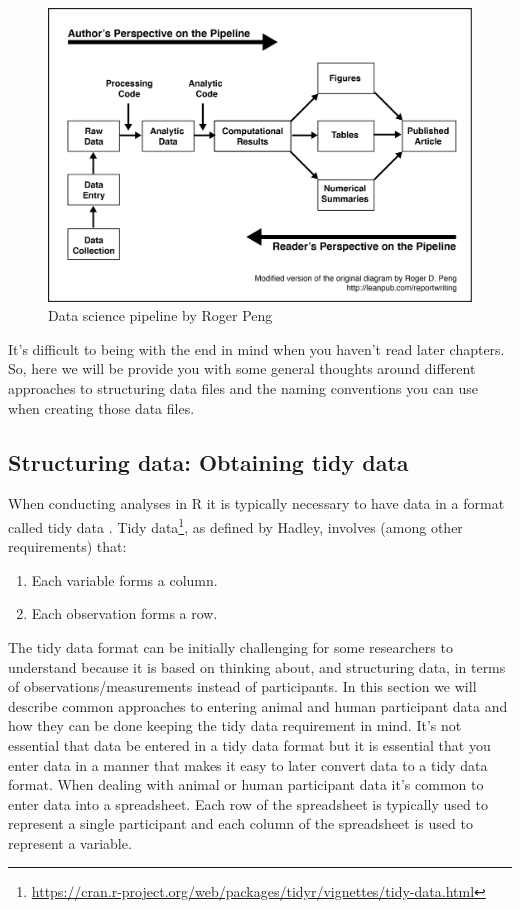 \documentclass[
]{krantz}
\renewcommand{\href}[2]{#2\footnote{\url{#1}}}
\begin{document}
\begin{figure}
\includegraphics[width=0.85\linewidth]{ch_enter_load/images/pipeline} \caption{Data science pipeline by Roger Peng}\label{fig:pipeline}
\end{figure}

It's difficult to being with the end in mind when you haven't read later chapters. So, here we will be provide you with some general thoughts around different approaches to structuring data files and the naming conventions you can use when creating those data files.

\hypertarget{structuring-data-obtaining-tidy-data}{%
\subsection{Structuring data: Obtaining tidy data}\label{structuring-data-obtaining-tidy-data}}

When conducting analyses in R it is typically necessary to have data in a format called tidy data \citep{tidy-data}. \href{https://cran.r-project.org/web/packages/tidyr/vignettes/tidy-data.html}{Tidy data}, as defined by Hadley, involves (among other requirements) that:

\begin{enumerate}
\def\labelenumi{\arabic{enumi}.}
\item
  Each variable forms a column.
\item
  Each observation forms a row.
\end{enumerate}

The tidy data format can be initially challenging for some researchers to understand because it is based on thinking about, and structuring data, in terms of observations/measurements instead of participants. In this section we will describe common approaches to entering animal and human participant data and how they can be done keeping the tidy data requirement in mind. It's not essential that data be entered in a tidy data format but it is essential that you enter data in a manner that makes it easy to later convert data to a tidy data format. When dealing with animal or human participant data it's common to enter data into a spreadsheet. Each row of the spreadsheet is typically used to represent a single participant and each column of the spreadsheet is used to represent a variable.
\end{document}
